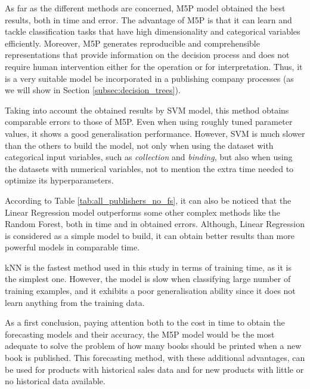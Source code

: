 \documentclass[a4paper,10pt,twocolumn,preprint,3p]{elsarticle}
\begin{document}
As far as the different methods are concerned, M5P model obtained the best results, both in time and error. The advantage of M5P is that it can learn and tackle classification tasks that have high dimensionality and categorical variables efficiently. Moreover, M5P generates reproducible and comprehensible representations that provide information on the decision process and does not require human intervention either for the operation or for interpretation. Thus, it is a very suitable model be incorporated in a publishing company 
processes (as we will show in Section \ref{subsec:decision_trees}).

Taking into account the obtained results by SVM model, this method obtains comparable errors to those of M5P. Even when using roughly tuned parameter values, it shows a good generalisation performance. However, SVM is much slower than the others to build the model, not only when using the dataset with categorical input variables, such as \emph{collection} and \emph{binding}, but also when using the datasets with numerical variables, not to mention the extra time needed to optimize its hyperparameters.

According to Table \ref{tab:all_publishers_no_fs}, it can also be noticed that 
the Linear Regression model outperforms some other complex methods like the 
Random Forest, both in time and in obtained errors. 
Although, Linear Regression is considered as a simple model to build, it can obtain better results than more powerful models in comparable time.

kNN is the fastest method used in this study in terms of training time, as it 
is the simplest one. However, the model is slow when classifying large number of 
training examples, and it exhibits a poor generalisation ability since it does not learn anything from the training data.


As a first conclusion, paying attention both to the cost in time to obtain the forecasting models and their accuracy, the M5P model would be the most adequate to solve the problem of how many books should be printed when a new book is published. This forecasting method, with these additional advantages, can be used for products with historical sales data and for new products with little or no historical data available.
\end{document}
